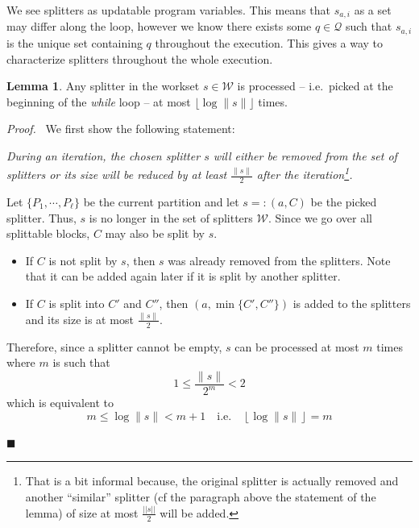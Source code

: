 \documentclass[12pt, a4 paper]{article}
\renewenvironment{proof}[1][Proof]{\begin{mdframed}[backgroundcolor=black!5, topline=false, rightline=false, bottomline=false, linecolor=black!15, linewidth=3pt]{\noindent\textit{#1.}\ }}{\noindent\par\hfill$\blacksquare$\end{mdframed}}
\theoremstyle{definition}
\newtheorem{lemma}{Lemma}
\begin{document}
We see splitters as updatable program variables.
This means that $s_{a,i}$ as a set may differ along the loop, however we know there exists some $q \in \mathcal{Q}$ such that $s_{a,i}$ is the unique set containing $q$ throughout the execution.
This gives a way to characterize splitters throughout the whole execution.

\bigskip

\begin{lemma}\label{lem:log}
    Any splitter in the workset $s \in \mathcal{W}$ is processed -- i.e.\ picked at the beginning of the \textit{while} loop -- at most $\lfloor \log \| s \| \rfloor$ times.
\end{lemma}
\begin{proof}
    We first show the following statement:

    \textit{During an iteration, the chosen splitter $s$ will either be removed from the set of splitters or its size will be reduced by at least $\frac{\| s\|}{2}$ after the iteration\footnote{That is a bit informal because, the original splitter is actually removed and another ``similar'' splitter (cf the paragraph above the statement of the lemma) of size at most $\frac{||s||}{2}$ will be added.}.}

    \bigskip
    Let $\{P_1, \cdots, P_\ell\}$ be the current partition and let $s =: (a, C)$ be the picked splitter. Thus, $s$ is no longer in the set of splitters $\mathcal{W}$. Since we go over all splittable blocks, $C$ may also be split by $s$.
    \begin{itemize}
        \item If $C$ is not split by $s$, then $s$ was already removed from the splitters. Note that it can be added again later if it is split by another splitter.
        \item If $C$ is split into $C'$ and $C''$, then $(a, \min\{C', C''\})$ is added to the splitters and its size is at most $\frac{\| s \|}{2}$.
    \end{itemize}
    Therefore, since a splitter cannot be empty, $s$ can be processed at most $m$ times where $m$ is such that
    $$ 1 \leq \frac{\| s \|}{2^m} < 2$$
    which is equivalent to
    $$ m \leq \log \| s \| < m + 1 \quad \text{i.e.}\quad \left\lfloor\log \| s \|\right\rfloor = m $$
\end{proof}

\bigskip
\end{document}
